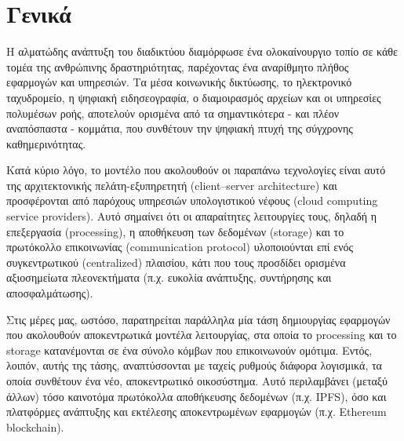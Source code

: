 \section{Γενικά}\label{section:1-1-general}

Η αλματώδης ανάπτυξη του διαδικτύου διαμόρφωσε ένα ολοκαίνουργιο τοπίο σε κάθε τομέα της ανθρώπινης δραστηριότητας, παρέχοντας ένα αναρίθμητο πλήθος εφαρμογών και υπηρεσιών. Τα μέσα κοινωνικής δικτύωσης,
το ηλεκτρονικό ταχυδρομείο, η ψηφιακή ειδησεογραφία, ο διαμοιρασμός αρχείων και
οι υπηρεσίες πολυμέσων ροής, αποτελούν ορισμένα από τα σημαντικότερα - και πλέον αναπόσπαστα - κομμάτια,
που συνθέτουν την ψηφιακή πτυχή της σύγχρονης καθημερινότητας. 

Κατά κύριο λόγο, το μοντέλο που ακολουθούν οι παραπάνω τεχνολογίες είναι αυτό της αρχιτεκτονικής πελάτη-εξυπηρετητή (client–server architecture) και προσφέρονται από παρόχους υπηρεσιών υπολογιστικού νέφους (cloud computing service providers). Αυτό σημαίνει ότι οι απαραίτητες λειτουργίες τους, δηλαδή η επεξεργασία (processing), η αποθήκευση των δεδομένων (storage) και το πρωτόκολλο επικοινωνίας (communication protocol) υλοποιούνται επί ενός συγκεντρωτικού (centralized) πλαισίου, κάτι που τους προσδίδει ορισμένα αξιοσημείωτα πλεονεκτήματα (π.χ. ευκολία ανάπτυξης, συντήρησης και αποσφαλμάτωσης).

Στις μέρες μας, ωστόσο, παρατηρείται παράλληλα μία τάση δημιουργίας εφαρμογών που ακολουθούν αποκεντρωτικά μοντέλα λειτουργίας, στα οποία το processing και το storage κατανέμονται σε ένα σύνολο κόμβων που επικοινωνούν ομότιμα. Εντός, λοιπόν, αυτής της τάσης, αναπτύσσονται με ταχείς ρυθμούς διάφορα λογισμικά, τα οποία συνθέτουν ένα νέο, αποκεντρωτικό οικοσύστημα. Αυτό περιλαμβάνει (μεταξύ άλλων) τόσο καινοτόμα πρωτόκολλα αποθήκευσης δεδομένων (π.χ. IPFS), όσο και πλατφόρμες ανάπτυξης και εκτέλεσης αποκεντρωμένων εφαρμογών (π.χ. Ethereum blockchain).

\newpage